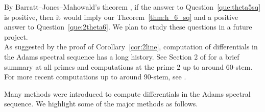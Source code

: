 \documentclass{amsart}
\numberwithin{equation}{section}
\begin{document}
By Barratt--Jones--Mahowald's theorem \cite{BJMinduction}, if the answer to Question~\ref{que:theta5sq} is positive, then it would imply our Theorem~\ref{thm:h_6_sq} and a positive answer to Question~\ref{que:2theta6}. We plan to study these questions in a future project.\\

As suggested by the proof of Corollary~\ref{cor:2line}, computation of differentials in the Adams spectral sequence has a long history. See Section 2 of \cite{WX61} for a brief summary at all primes and computations at the prime 2 up to around 60-stem. For more recent computations up to around 90-stem, see \cite{IWX, IWXsurvey, WXems, WXicm}.

Many methods were introduced to compute differentials in the Adams spectral sequence. We highlight some of the major methods as follows.
\end{document}
